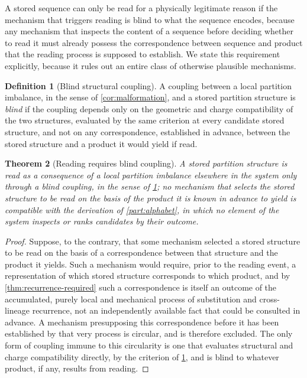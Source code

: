 \documentclass[11pt,twocolumn,a4paper]{article}
\theoremstyle{plain}
\newtheorem{theorem}{Theorem}[section]
\theoremstyle{definition}
\newtheorem{definition}[theorem]{Definition}
\theoremstyle{remark}
\begin{document}
A stored sequence can only be read for a physically legitimate reason if the
mechanism that triggers reading is blind to what the sequence encodes,
because any mechanism that inspects the content of a sequence before
deciding whether to read it must already possess the correspondence between
sequence and product that the reading process is supposed to establish. We
state this requirement explicitly, because it rules out an entire class of
otherwise plausible mechanisms.

\begin{definition}[Blind structural coupling]
\label{def:blindcoupling}
A coupling between a local partition imbalance, in the sense of
\cref{cor:malformation}, and a stored partition structure is \emph{blind} if
the coupling depends only on the geometric and charge compatibility of the
two structures, evaluated by the same criterion at every candidate stored
structure, and not on any correspondence, established in advance, between
the stored structure and a product it would yield if read.
\end{definition}

\begin{theorem}[Reading requires blind coupling]
\label{thm:blind-required}
A stored partition structure is read as a consequence of a local partition
imbalance elsewhere in the system only through a blind coupling, in the
sense of \cref{def:blindcoupling}; no mechanism that selects the stored
structure to be read on the basis of the product it is known in advance to
yield is compatible with the derivation of \cref{part:alphabet}, in which no
element of the system inspects or ranks candidates by their outcome.
\end{theorem}

\begin{proof}
Suppose, to the contrary, that some mechanism selected a stored structure to
be read on the basis of a correspondence between that structure and the
product it yields. Such a mechanism would require, prior to the reading
event, a representation of which stored structure corresponds to which
product, and by \cref{thm:recurrence-required} such a correspondence is
itself an outcome of the accumulated, purely local and mechanical process of
substitution and cross-lineage recurrence, not an independently available
fact that could be consulted in advance. A mechanism presupposing this
correspondence before it has been established by that very process is
circular, and is therefore excluded. The only form of coupling immune to
this circularity is one that evaluates structural and charge compatibility
directly, by the criterion of \cref{def:blindcoupling}, and is blind to
whatever product, if any, results from reading.
\end{proof}
\end{document}
